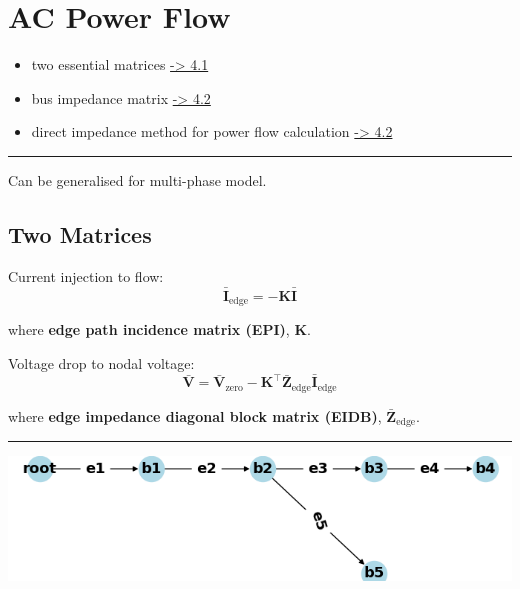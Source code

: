 \documentclass[
]{book}
\providecommand{\tightlist}{%
  \setlength{\itemsep}{0pt}\setlength{\parskip}{0pt}}
\begin{document}
\hypertarget{ac-power-flow}{%
\chapter{AC Power Flow}\label{ac-power-flow}}

\begin{itemize}
\tightlist
\item
  two essential matrices \protect\hyperlink{matrices}{-\textgreater{} 4.1}
\item
  bus impedance matrix \protect\hyperlink{BIM}{-\textgreater{} 4.2}
\item
  direct impedance method for power flow calculation \protect\hyperlink{power-flow}{-\textgreater{} 4.2}
\end{itemize}

\begin{center}\rule{0.5\linewidth}{0.5pt}\end{center}

Can be generalised for multi-phase model. \citep{hsieh2017matrix}

\hypertarget{matrices}{%
\section{Two Matrices}\label{matrices}}

Current injection to flow:
\[
  \bar{\boldsymbol{I}}_{\text{edge}} =
  - \boldsymbol{K} \bar{\boldsymbol{I}}
\]

where \textbf{edge path incidence matrix (EPI)}, \(\boldsymbol{K}\).

Voltage drop to nodal voltage:
\[
  \bar{\boldsymbol{V}} =
  \bar{\boldsymbol{V}}_{\text{zero}}
  - \boldsymbol{K}^{\top} \boldsymbol{\bar{Z}}_\text{edge}
  \bar{\boldsymbol{I}}_{\text{edge}} 
\]

where \textbf{edge impedance diagonal block matrix (EIDB)},
\(\boldsymbol{\bar{Z}}_\text{edge}\).

\begin{center}\rule{0.5\linewidth}{0.5pt}\end{center}

\begin{center}\includegraphics[width=0.7\linewidth]{Pictures/figCaseSix} \end{center}
\end{document}
